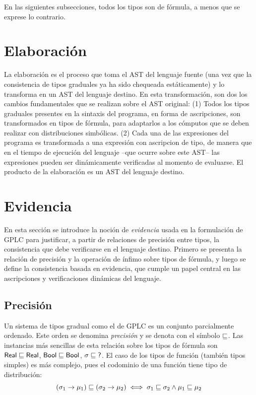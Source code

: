En las siguientes subsecciones, todos los tipos son de fórmula, a menos que se exprese lo contrario.

\section{Elaboración}\label{sec:elab}
  
La elaboración es el proceso que toma el AST del lenguaje fuente (una
vez que la consistencia de tipos graduales ya ha sido chequeada
estáticamente) y lo transforma en un AST del lenguaje destino. En esta
transformación, son dos los cambios fundamentales que se realizan
sobre el AST original: {(1)} Todos los tipos graduales presentes en la sintaxis del programa, en forma de ascripciones, son
transformados en tipos de fórmula, para adaptarlos a los cómputos que
se deben realizar con distribuciones simbólicas. {(2)} Cada una de las
expresiones del programa es transformada a una expresión con
ascripcion de tipo, de manera que en el tiempo de ejecución del lenguaje --que
ocurre sobre este AST-- las expresiones pueden ser dinámicamente
verificadas al momento de evaluarse. El producto de la elaboración es
un AST del lenguaje destino.

\section{Evidencia}\label{sec:evidence}
En esta sección se introduce la noción de \emph{evidencia} usada en la
formulación de GPLC para justificar, a partir de relaciones de
precisión entre tipos, la consistencia que debe verificarse en el
lenguaje destino. Primero se presenta la relación de
precisión y la operación de ínfimo sobre tipos de fórmula, y luego se
define la consistencia basada en evidencia, que cumple un papel central
en las ascripciones y verificaciones dinámicas del lenguaje.

\subsection{Precisión}\label{par:precision} Un sistema de tipos gradual como el de GPLC es un conjunto parcialmente ordenado. Este orden se denomina \emph{precisión} y se denota con el símbolo $\sqsubseteq$. Las instancias más sencillas de esta relación sobre los tipos de fórmula son $\mathord{\text{\sffamily Real}} \sqsubseteq \mathord{\text{\sffamily Real}}$, $\mathord{\text{\sffamily Bool}} \sqsubseteq \mathord{\text{\sffamily Bool}}$, $\sigma\sqsubseteq\mathord{\text{\sffamily ?}}$. El caso de los tipos de función (también tipos simples) es más complejo, pues el codominio de una función tiene tipo de distribución:
\[
  (\sigma_1 \to \mu_1) \sqsubseteq (\sigma_2 \to \mu_2) \iff
  \sigma_1 \sqsubseteq \sigma_2 \land \mu_1 \sqsubseteq \mu_2
\]

